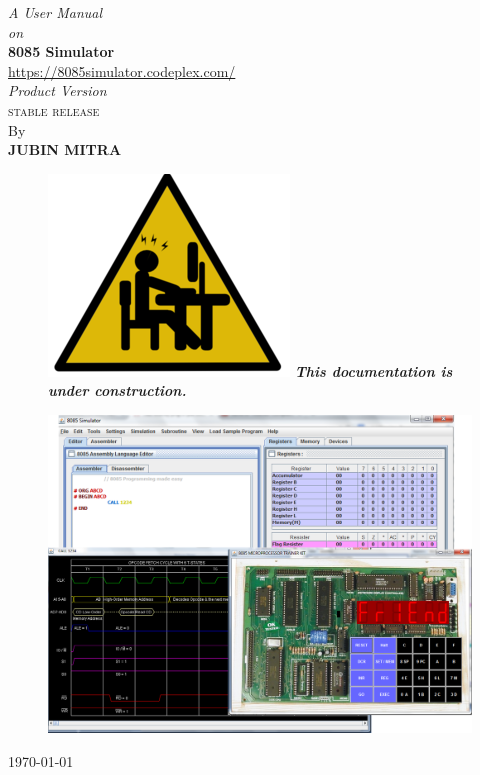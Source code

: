 \thispagestyle{empty}

\begin{center}
\vspace{0.03\textheight}
\textit{A User Manual\\}
\vspace{0.01\textheight}
\textit{on\\}
\vspace{0.03\textheight}
{\Huge\textbf{8085 Simulator
}}\\
{\url{https://8085simulator.codeplex.com/}}\\
\vspace{0.015\textheight}
\textit{Product Version \ver}\\
\textsc{stable release}
\vspace{0.015\textheight}
\\By\\
\textbf{\textsc{JUBIN MITRA}}\\
\begin{figure}[htbp]
\centering
\includegraphics[width=0.1\linewidth]{construction}
\textit{\textbf{ This documentation is under construction.}}
\end{figure} 
\vspace{0.03\textheight}
\begin{figure}[H]
\centering

\includegraphics[width=\linewidth]{"./top_page1"}
\end{figure}
\today
\end{center}


